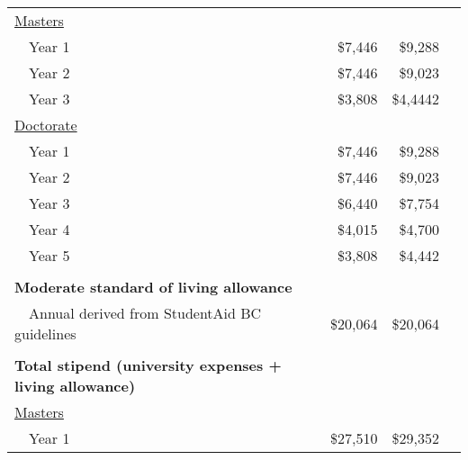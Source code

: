 \documentclass[11pt]{article}
\begin{document}
\begin{center}
\begin{tabular}{lrrr}
		\underline{Masters}                                             &                   &                          \\
		~~Year 1                                                        & \$7,446           & \$9,288                  \\
		~~Year 2                                                        & \$7,446           & \$9,023                  \\
		~~Year 3                                                        & \$3,808           & \$4,4442                 \\
		\underline{Doctorate}                                           &                   &                          \\
		~~Year 1                                                        & \$7,446           & \$9,288                  \\
		~~Year 2                                                        & \$7,446           & \$9,023                  \\
		~~Year 3                                                        & \$6,440           & \$7,754                  \\
		~~Year 4                                                        & \$4,015           & \$4,700                  \\
		~~Year 5                                                        & \$3,808           & \$4,442                  \\
		                                                                &                   &                        & \\
		\textbf{Moderate standard of living allowance}                  &                   &                          \\
		~~Annual derived from StudentAid BC guidelines                  & \$20,064          & \$20,064                 \\
		                                                                &                   &                        & \\
		\textbf{Total stipend (university expenses + living allowance)} &                   &                          \\
		\underline{Masters}                                             &                   &                          \\
		~~Year 1                                                        & \$27,510          & \$29,352                 \\

\end{tabular}
\end{center}
\end{document}
